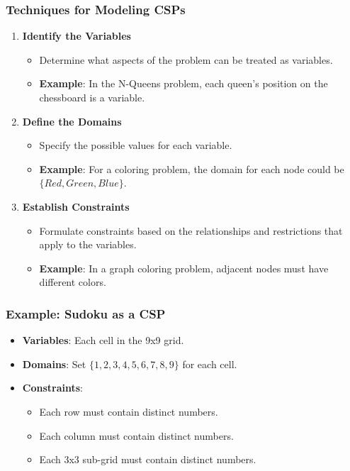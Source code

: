 \documentclass[aspectratio=169]{beamer}
\begin{document}
\begin{frame}[fragile]
    \frametitle{Techniques for Modeling CSPs}
    \begin{enumerate}
        \item \textbf{Identify the Variables}
            \begin{itemize}
                \item Determine what aspects of the problem can be treated as variables.
                \item \textbf{Example}: In the N-Queens problem, each queen's position on the chessboard is a variable.
            \end{itemize}
        \item \textbf{Define the Domains}
            \begin{itemize}
                \item Specify the possible values for each variable.
                \item \textbf{Example}: For a coloring problem, the domain for each node could be $\{Red, Green, Blue\}$.
            \end{itemize}
        \item \textbf{Establish Constraints}
            \begin{itemize}
                \item Formulate constraints based on the relationships and restrictions that apply to the variables.
                \item \textbf{Example}: In a graph coloring problem, adjacent nodes must have different colors.
            \end{itemize}
    \end{enumerate}
\end{frame}

\begin{frame}[fragile]
    \frametitle{Example: Sudoku as a CSP}
    \begin{itemize}
        \item \textbf{Variables}: Each cell in the 9x9 grid.
        \item \textbf{Domains}: Set $\{1, 2, 3, 4, 5, 6, 7, 8, 9\}$ for each cell.
        \item \textbf{Constraints}:
            \begin{itemize}
                \item Each row must contain distinct numbers.
                \item Each column must contain distinct numbers.
                \item Each 3x3 sub-grid must contain distinct numbers.
            \end{itemize}
    \end{itemize}
\end{frame}
\end{document}
